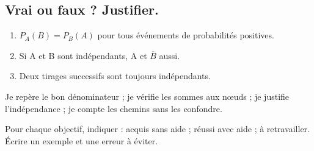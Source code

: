 \subsection*{Vrai ou faux ? Justifier.}\label{C05-VF}
\begin{enumerate}
\item $P_A(B)=P_B(A)$ pour tous événements de probabilités positives.
\item Si A et B sont indépendants, A et $\overline B$ aussi.
\item Deux tirages successifs sont toujours indépendants.
\end{enumerate}
\begin{keypoint}Je repère le bon dénominateur ; je vérifie les sommes aux nœuds ; je justifie l’indépendance ; je compte les chemins sans les confondre.

Pour chaque objectif, indiquer : acquis sans aide ; réussi avec aide ; à retravailler. Écrire un exemple et une erreur à éviter.\end{keypoint}
\endgroup
\ifmxteacher{}\fi
